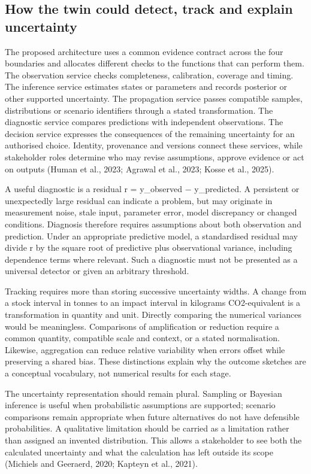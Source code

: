 \subsection{How the twin could detect, track and explain uncertainty}
The proposed architecture uses a common evidence contract across the four boundaries and allocates different checks to the functions that can perform them. The observation service checks completeness, calibration, coverage and timing. The inference service estimates states or parameters and records posterior or other supported uncertainty. The propagation service passes compatible samples, distributions or scenario identifiers through a stated transformation. The diagnostic service compares predictions with independent observations. The decision service expresses the consequences of the remaining uncertainty for an authorised choice. Identity, provenance and versions connect these services, while stakeholder roles determine who may revise assumptions, approve evidence or act on outputs (Human et al., 2023; Agrawal et al., 2023; Kosse et al., 2025).

A useful diagnostic is a residual r = y\_observed − y\_predicted. A persistent or unexpectedly large residual can indicate a problem, but may originate in measurement noise, stale input, parameter error, model discrepancy or changed conditions. Diagnosis therefore requires assumptions about both observation and prediction. Under an appropriate predictive model, a standardised residual may divide r by the square root of predictive plus observational variance, including dependence terms where relevant. Such a diagnostic must not be presented as a universal detector or given an arbitrary threshold.

Tracking requires more than storing successive uncertainty widths. A change from a stock interval in tonnes to an impact interval in kilograms CO2-equivalent is a transformation in quantity and unit. Directly comparing the numerical variances would be meaningless. Comparisons of amplification or reduction require a common quantity, compatible scale and context, or a stated normalisation. Likewise, aggregation can reduce relative variability when errors offset while preserving a shared bias. These distinctions explain why the outcome sketches are a conceptual vocabulary, not numerical results for each stage.

The uncertainty representation should remain plural. Sampling or Bayesian inference is useful when probabilistic assumptions are supported; scenario comparisons remain appropriate when future alternatives do not have defensible probabilities. A qualitative limitation should be carried as a limitation rather than assigned an invented distribution. This allows a stakeholder to see both the calculated uncertainty and what the calculation has left outside its scope (Michiels and Geeraerd, 2020; Kapteyn et al., 2021).


